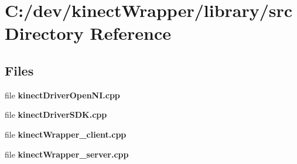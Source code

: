 \section{C\+:/dev/kinect\+Wrapper/library/src Directory Reference}
\label{dir_255fa8f554e95a439f260058328638ab}
\subsection*{Files}
\begin{DoxyCompactItemize}
\item 
file {\bfseries kinect\+Driver\+Open\+N\+I.\+cpp}
\item 
file {\bfseries kinect\+Driver\+S\+D\+K.\+cpp}
\item 
file {\bfseries kinect\+Wrapper\+\_\+client.\+cpp}
\item 
file {\bfseries kinect\+Wrapper\+\_\+server.\+cpp}
\end{DoxyCompactItemize}
